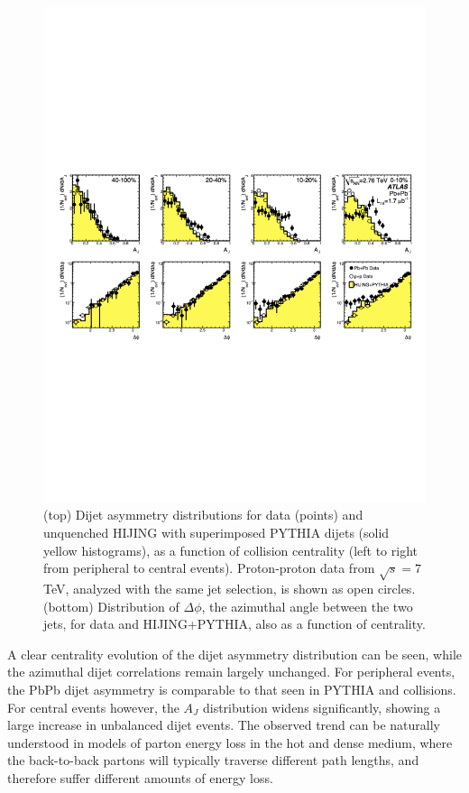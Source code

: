 \begin{figure}[thb]
\begin{center}
\vspace{-9cm}
\includegraphics[width=0.9\mboxwidth]{jetfigures/ATLAS_dijet_crop.pdf}
\vspace{-7.5cm}
\caption{
(top) Dijet asymmetry distributions for data (points) and unquenched HIJING with superimposed PYTHIA dijets (solid yellow histograms),
as a function of collision centrality (left to right from peripheral
to central events).  Proton-proton data from $\sqrt{s}=7$ TeV, analyzed with the same jet selection, is shown as open circles.
(bottom) Distribution of $\Delta\phi$, the azimuthal angle between the two jets, for data and HIJING+PYTHIA, also as a function of centrality.
\label{fig:GR:final_4x2}
}
\end{center}
\end{figure}

A clear centrality evolution of the dijet asymmetry distribution can be seen, while the azimuthal
dijet correlations remain largely unchanged. For peripheral events, the PbPb dijet asymmetry
is comparable to that seen in PYTHIA and \pp collisions. For central events however, 
the $A_J$ distribution widens significantly, showing a large increase in unbalanced
dijet events. The observed trend can be naturally understood in models of parton energy
loss in the hot and dense medium, where the back-to-back partons will typically traverse
different path lengths, and therefore suffer different amounts of energy loss.

